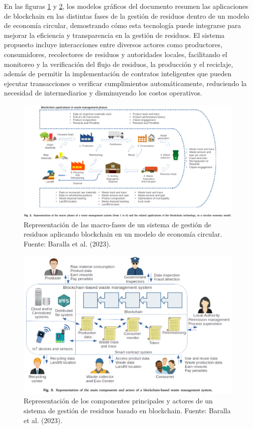 \documentclass[main.tex]{subfiles}
\begin{document}
En las figuras \ref{fig:baralla-1} y \ref{fig:baralla-2}, los modelos gráficos del documento resumen las aplicaciones de blockchain en las distintas fases de la gestión de residuos dentro de un modelo de economía circular, demostrando cómo esta tecnología puede integrarse para mejorar la eficiencia y transparencia en la gestión de residuos. El sistema propuesto incluye interacciones entre diversos actores como productores, consumidores, recolectores de residuos y autoridades locales, facilitando el monitoreo y la verificación del flujo de residuos, la producción y el reciclaje, además de permitir la implementación de contratos inteligentes que pueden ejecutar transacciones o verificar cumplimientos automáticamente, reduciendo la necesidad de intermediarios y disminuyendo los costos operativos.

\begin{figure}[h]
	\centering
	\includegraphics[width=1\textwidth]{../assets/baralla-model-1.png}
	\caption{Representación de las macro-fases de un sistema de gestión de residuos aplicando blockchain en un modelo de economía circular. Fuente: Baralla et al. (2023).}
	\label{fig:baralla-1}
\end{figure}

\begin{figure}[h]
	\centering
	\includegraphics[width=1\textwidth]{../assets/baralla-model-2.png}
	\caption{Representación de los componentes principales y actores de un sistema de gestión de residuos basado en blockchain. Fuente: Baralla et al. (2023).}
	\label{fig:baralla-2}
\end{figure}
\end{document}
